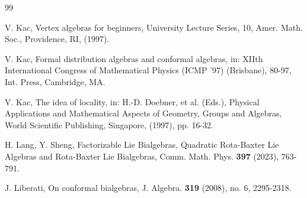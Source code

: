 \documentclass[12pt]{amsart}
\begin{document}
\begin{thebibliography}{99}






V. Kac,  Vertex algebras for beginners, University Lecture Series, 10, Amer. Math. Soc., Providence, RI, (1997).

V. Kac, Formal distribution algebras and conformal algebras, in:
XIIth International Congress of Mathematical Physics (ICMP '97)
(Brisbane), 80-97, Int. Press, Cambridge, MA.

V. Kac, The idea of locality, in: H.-D. Doebner, et al. (Eds.),
Physical Applications and Mathematical Aspects of Geometry, Groups
and Algebras, World Scientific Publishing, Singapore, (1997), pp.
16-32.







H. Lang,  Y. Sheng, Factorizable Lie Bialgebras, Quadratic
Rota-Baxter Lie Algebras and Rota-Baxter Lie Bialgebras, Comm.
Math. Phys. {\bf397} (2023), 763-791.

J. Liberati, On conformal bialgebras, J. Algebra. {\bf 319}
(2008), no. 6, 2295-2318.






\end{thebibliography}
\end{document}
